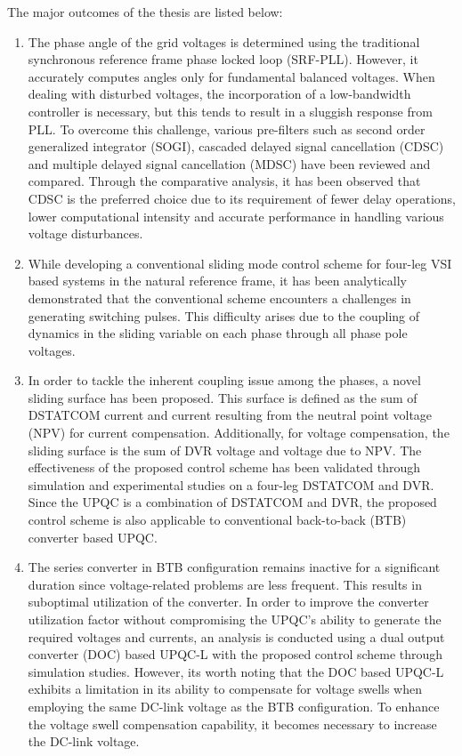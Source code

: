 The major outcomes of the thesis are listed below:
\begin{enumerate}
	\item The phase angle of the grid voltages is determined using the traditional synchronous reference frame phase locked loop (SRF-PLL). However, it accurately computes angles only for fundamental balanced voltages. When dealing with disturbed voltages, the incorporation of a low-bandwidth controller is necessary, but this tends to result in a sluggish response from PLL. To overcome this challenge, various pre-filters such as second order generalized integrator (SOGI), cascaded delayed signal cancellation (CDSC) and multiple delayed signal cancellation (MDSC) have been reviewed and compared. Through the comparative analysis, it has been observed that CDSC is the preferred choice due to its requirement of fewer delay operations, lower computational intensity and accurate performance in handling various voltage disturbances.    
	\item While developing a conventional sliding mode control scheme for four-leg VSI based systems in the natural reference frame, it has been analytically demonstrated that the conventional scheme encounters a challenges in generating switching pulses. This difficulty arises due to the coupling of dynamics in the sliding variable on each phase through all phase pole voltages. 
	\item In order to tackle the inherent coupling issue among the phases, a novel sliding surface has been proposed. This surface is defined as the sum of DSTATCOM current and current resulting from the neutral point voltage (NPV) for current compensation. Additionally, for voltage compensation, the sliding surface is the sum of DVR voltage and voltage due to NPV. The effectiveness of the proposed control scheme has been validated through simulation and experimental studies on a four-leg DSTATCOM and DVR. Since the UPQC is a combination of DSTATCOM and DVR, the proposed control scheme is also applicable to conventional back-to-back (BTB) converter based UPQC.
	\item The series converter in BTB configuration remains inactive for a significant duration since voltage-related problems are less frequent. This results in suboptimal utilization of the converter. In order to improve the converter utilization factor without compromising the UPQC’s ability to generate the required voltages and currents, an analysis is conducted using a dual output converter (DOC) based UPQC-L with the proposed control scheme through simulation studies. However, its worth noting that the DOC based UPQC-L exhibits a limitation in its ability to compensate for voltage swells when employing the same DC-link voltage as the BTB configuration. To enhance the voltage swell compensation capability, it becomes necessary to increase the DC-link voltage.  
\end{enumerate}

